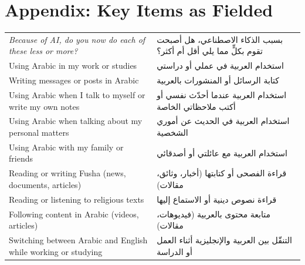 \documentclass[conference]{IEEEtran}
\newcommand{\ar}[1]{{\arabicfont\beginR #1\endR}}
\begin{document}
\section*{Appendix: Key Items as Fielded}
{\scriptsize
\setlength{\tabcolsep}{2pt}
\noindent\begin{tabular}{@{}>{\raggedright\arraybackslash}p{}>{\raggedleft\arraybackslash}p{}@{}}
\toprule
\emph{Because of AI, do you now do each of these less or more?} & \ar{بسبب الذكاء الاصطناعي، هل أصبحت تقوم بكلٍّ مما يلي أقل أم أكثر؟} \\
Using Arabic in my work or studies & \ar{استخدام العربية في عملي أو دراستي} \\
Writing messages or posts in Arabic & \ar{كتابة الرسائل أو المنشورات بالعربية} \\
Using Arabic when I talk to myself or write my own notes & \ar{استخدام العربية عندما أحدّث نفسي أو أكتب ملاحظاتي الخاصة} \\
Using Arabic when talking about my personal matters & \ar{استخدام العربية في الحديث عن أموري الشخصية} \\
Using Arabic with my family or friends & \ar{استخدام العربية مع عائلتي أو أصدقائي} \\
Reading or writing Fusha (news, documents, articles) & \ar{قراءة الفصحى أو كتابتها (أخبار، وثائق، مقالات)} \\
Reading or listening to religious texts & \ar{قراءة نصوص دينية أو الاستماع إليها} \\
Following content in Arabic (videos, articles) & \ar{متابعة محتوى بالعربية (فيديوهات، مقالات)} \\
Switching between Arabic and English while working or studying & \ar{التنقّل بين العربية والإنجليزية أثناء العمل أو الدراسة} \\
\bottomrule
\end{tabular}}



\end{document}
